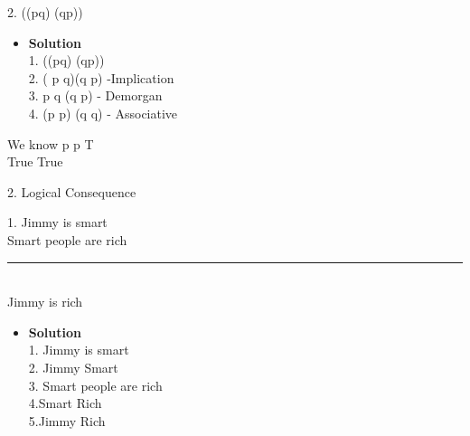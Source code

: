 \documentclass[11pt]{article}
\begin{document}
\begin{enumerate}

\begin{flushleft}
{\large 2. \neg((p\land q) \rightarrow (q\lor p))}
\end{flushleft}

   
\begin{itemize}

\item \textbf{Solution}\\
\large 1. \neg((p\land q) \rightarrow (q\lor p))\\
\large 2. \neg( p \land q)\lor(q \lor p) -Implication\\
\large 3. \neg p \lor \neg q \lor (q \lor p) - Demorgan\\
\large 4. (\neg p \lor p) \lor (\neg q \lor q) - Associative \\
\end {itemize} 
We know p \lor \neg p \equiv T \\
\therefore True \equiv True \\

\end {enumerate}

\begin{flushleft}
{\Large 2. Logical Consequence}
\end{flushleft}


\begin{enumerate}

\begin{flushleft}
{\large 1. Jimmy is smart\\
\large \hspace{.4cm} Smart people are rich\\
\large\noindent\rule{5cm}{0.4pt} \\
\large Jimmy is rich}
\end{flushleft}
\end {enumerate}


\begin{itemize}

\item \textbf{Solution}\\
\large 1. Jimmy is smart \\
\large 2. Jimmy \rightarrow Smart \\
\large 3.\hspace{.2cm} Smart\hspace{.2cm} people\hspace{.2cm} are\hspace{.2cm} rich  \\
\large 4.\hspace{.2cm}Smart \rightarrow Rich \\
\large 5.\hspace{.2cm}Jimmy \rightarrow Rich \\

\end {itemize}
\end{document}
